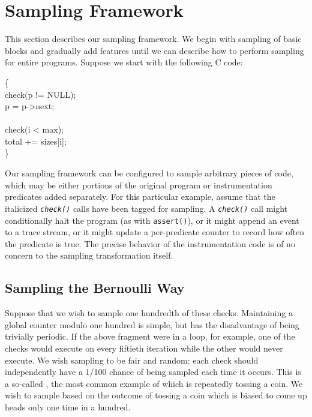 \section{Sampling Framework}
\label{sec:framework}

This section describes our sampling framework.  We begin with sampling
of basic blocks and gradually add features until we can describe how
to perform sampling for entire programs.  Suppose we start with the
following C code:

\begin{code}
  \{\+ \\
  check(p != NULL); \\
  \up p = p->next; \\
  \\
  check(i < max); \\
  \up total += sizes[i]; \\
  \<\}
\end{code}

Our sampling framework can be configured to sample arbitrary pieces of
code, which may be either portions of the original program or
instrumentation predicates added separately.  For this particular
example, assume that the italicized \texttt{\textit{check()}} calls
have been tagged for sampling.  A \texttt{\textit{check()}} call might
conditionally halt the program (as with \texttt{assert()}), or it
might append an event to a trace stream, or it might update a
per-predicate counter to record how often the predicate is true.  The
precise behavior of the instrumentation code is of no concern to the
sampling transformation itself.

\subsection{Sampling the Bernoulli Way}

Suppose that we wish to sample one hundredth of these checks.
Maintaining a global counter modulo one hundred is simple, but has the
disadvantage of being trivially periodic.  If the above fragment were
in a loop, for example, one of the checks would execute on every
fiftieth iteration while the other would never execute.  We wish
sampling to be fair and random: each check should independently have a
1/100 chance of being sampled each time it occurs.  This is a
so-called , the most common example of
which is repeatedly tossing a coin.  We wish to sample based on the
outcome of tossing a coin which is biased to come up heads only one
time in a hundred.

